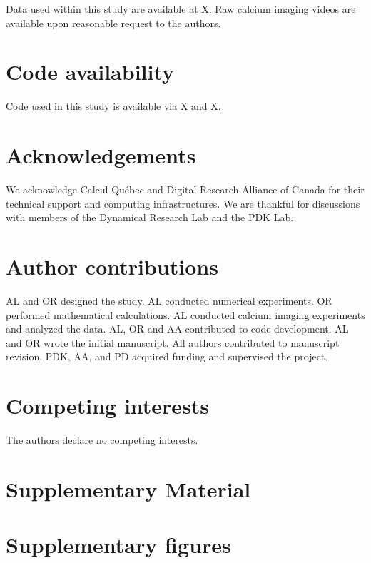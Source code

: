 \documentclass{article}
\begin{document}
Data used within this study are available at X. Raw calcium imaging videos are available upon reasonable request to the authors.

\section*{Code availability}

Code used in this study is available via X and X.
















\section*{Acknowledgements}

We acknowledge Calcul Québec and Digital Research Alliance of Canada for their technical support and computing infrastructures. We are thankful for discussions with members of the Dynamical Research Lab and the PDK Lab.

\section*{Author contributions}

AL and OR designed the study. AL conducted numerical experiments. OR performed mathematical calculations. AL conducted calcium imaging experiments and analyzed the data. AL, OR and AA contributed to code development. AL and OR wrote the initial manuscript. All authors contributed to manuscript revision. PDK, AA, and PD acquired funding and supervised the project.

\section*{Competing interests}

The authors declare no competing interests. 

\newpage



\section*{Supplementary Material}

\section*{Supplementary figures}
\end{document}
